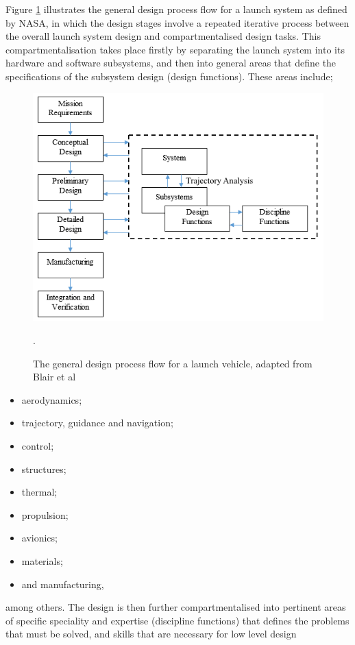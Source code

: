      Figure \ref{fig:DesignFlow} illustrates the general design process flow for a launch system as defined by NASA\cite{Blair2001}, in which the design stages involve a repeated iterative process between the overall launch system design and compartmentalised design tasks. This compartmentalisation takes place firstly by separating the
    launch system into its hardware and software subsystems, and then into general areas that define the specifications of the subsystem design (design functions). These areas include;
    \begin{figure}[ht]
    	\centering
    	\includegraphics[width=0.7\linewidth]{figures/2_literature-review/DesignFlow}
    	\caption{The general design process flow for a launch vehicle, adapted from Blair et al\cite{Blair2001}}.
    	\label{fig:DesignFlow}
    \end{figure}
    \begin{itemize}
    	\setlength\itemsep{.2em}
    	\item aerodynamics;
    	\item trajectory, guidance and navigation;
    	\item control;
    	\item structures;
    	\item thermal;
    	\item propulsion;
    	\item avionics;
    	\item materials;
    	\item and manufacturing,
    \end{itemize}
    among others\cite{Blair2001}. The design is then further compartmentalised into pertinent areas of specific speciality and expertise (discipline functions) that defines the problems that must be solved, and skills that are necessary for low level design
    

